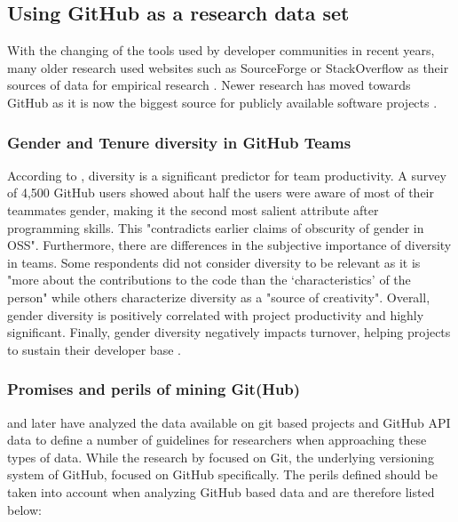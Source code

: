 \subsection{Using GitHub as a research data set}

With the changing of the tools used by developer communities in recent years, many older research used websites such as SourceForge or StackOverflow as their sources of data for empirical research \cite{vasilescu:2012:6542459,doi:10.1287/mnsc.1060.0550}. Newer research has moved towards GitHub as it is now the biggest source for publicly available software projects \cite{Vasilescu:2015:GTD:2702123.2702549}.

\subsubsection{Gender and Tenure diversity in GitHub Teams}

According to \citeauthor{Vasilescu:2015:GTD:2702123.2702549}, diversity is a significant predictor for team productivity. A survey of 4,500 GitHub users showed about half the users were aware of most of their teammates gender, making it the second most salient attribute after programming skills. This "contradicts earlier claims of obscurity of gender in OSS". Furthermore, there are differences in the subjective importance of diversity in teams. Some respondents did not consider diversity to be relevant as it is "more about the contributions to the code than the ‘characteristics’ of the person" while others characterize diversity as a "source of creativity". Overall, gender diversity is positively correlated with project productivity and highly significant. Finally, gender diversity negatively impacts turnover, helping projects to sustain their developer base  \cite{Vasilescu:2015:GTD:2702123.2702549}.

\subsubsection{Promises and perils of mining Git(Hub)}


\citeauthor{perils-ms-research:2009} and later \citeauthor{perils-github:2015} have analyzed the data available on git based projects and GitHub \ac{API} data to define a number of guidelines for researchers when approaching these types of data. While the research by \citeauthor{perils-ms-research:2009} focused on Git, the underlying versioning system of GitHub, \citeauthor{perils-github:2015} focused on GitHub specifically. The perils defined should be taken into account when analyzing GitHub based data and are therefore listed below:

